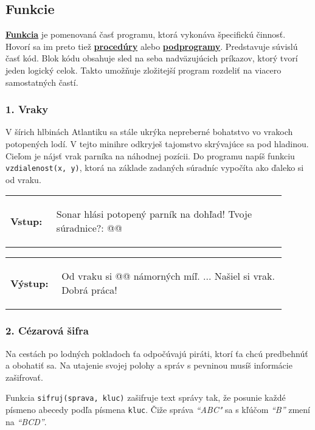 \subsection{Funkcie}
\underline{\textbf{Funkcia}} je pomenovaná časť programu, ktorá vykonáva špecifickú činnosť. Hovorí sa im preto tiež \underline{\textbf{procedúry}} alebo \underline{\textbf{podprogramy}}. Predstavuje súvislú časť kód. Blok kódu obsahuje sled na seba nadväzujúcich príkazov, ktorý tvorí jeden logický celok. Takto umožňuje zložitejší program rozdeliť na viacero samostatných častí.

\subsubsection*{1. Vraky}
V šírich hlbinách Atlantiku sa stále ukrýka nepreberné bohatstvo vo vrakoch potopených lodí. V tejto minihre odkryješ tajomstvo skrývajúce sa pod hladinou. Cieľom je nájsť vrak parníka na náhodnej pozícii. Do programu napíš funkciu \verb|vzdialenost(x, y)|, ktorá na základe zadaných súradníc vypočíta ako ďaleko si od vraku.

\begin{tabular}{@{}p{0.15\linewidth}p{0.75\linewidth}}
\textbf{\small Vstup:} &
\vspace{-3em}
\begin{code}
Sonar hlási potopený parník na dohľad!
Tvoje súradnice?: @\fbox{\phantom{123}}@
\end{code}
\end{tabular}

\vspace{-2em}
\begin{tabular}{@{}p{0.15\linewidth}p{0.75\linewidth}}
\textbf{\small Výstup:} &
\vspace{-3em}
\begin{code}
Od vraku si @\fbox{\phantom{vstup}}@ námorných míľ.
...
Našiel si vrak. Dobrá práca!
\end{code}
\end{tabular}
\vspace{-2em}


\subsubsection*{2. Cézarová šifra}
Na cestách po lodných pokladoch ťa odpočúvajú piráti, ktorí ťa chcú predbehnúť a obohatiť sa. Na utajenie svojej polohy a správ s pevninou musíš informácie zašifrovať. 

Funkcia \verb|sifruj(sprava, kluc)| zašifruje text správy tak, že posunie každé písmeno abecedy podľa písmena \verb|kluc|. Čiže správa \emph{``ABC"} sa s kľúčom \emph{``B''} zmení na \emph{``BCD''}. 


